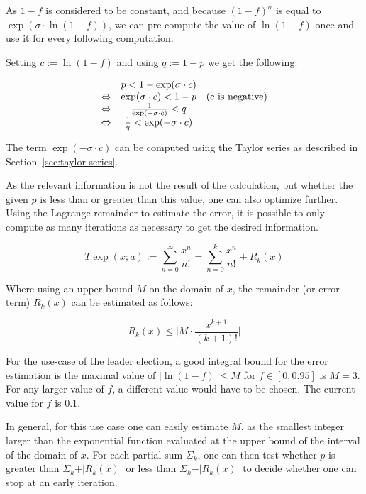 \documentclass[11pt,a4paper,dvipsnames]{article}
\theoremstyle{definition}
\theoremstyle{definition}
\begin{document}
As $1-f$ is considered to be constant, and because ${(1-f)}^{\sigma}$ is equal
to $\exp(\sigma\cdot\ln(1-f))$, we can pre-compute the value of $\ln(1-f)$ once
and use it for every following computation.

Setting $c:= \ln(1 - f)$ and using $q := 1 - p$ we get the following:

\begin{equation*}
  \begin{array}[h]{ccc}
    & p < 1 - \exp(\sigma \cdot c) & \\
    \Leftrightarrow & \exp(\sigma \cdot c) < 1 - p & (\textrm{c is negative})\\
    \Leftrightarrow & \frac{1}{\exp(-\sigma \cdot c)} < q & \\
    \Leftrightarrow & \frac{1}{q} < \exp(-\sigma \cdot c) &
  \end{array}
\end{equation*}

The term $\exp(-\sigma \cdot c)$ can be computed using the Taylor series as
described in Section~\ref{sec:taylor-series}.

As the relevant information is not the result of the calculation, but whether
the given $p$ is less than or greater than this value, one can also optimize
further. Using the Lagrange remainder to estimate the error, it is possible to
only compute as many iterations as necessary to get the desired information.

\begin{equation*}
    T \exp(x; a) := \sum_{n=0}^{\infty}\frac{x^{n}}{n!} =
    \sum_{n=0}^k\frac{x^{n}}{n!} + R_{k}(x)
\end{equation*}

Where using an upper bound $M$ on the domain of $x$, the remainder (or error
term) $R_{k}(x)$ can be estimated as follows:

\begin{equation*}
  R_{k}(x) \leq \vert M \cdot \frac{x^{k+1}}{(k+1)!}\vert
\end{equation*}

For the use-case of the leader election, a good integral bound for the error
estimation is the maximal value of $\vert\ln(1 - f)\vert\leq M$ for
$f \in [0, 0.95]$ is $M = 3$. For any larger value of $f$, a different value
would have to be chosen. The current value for $f$ is $0.1$.

In general, for this use case one can easily estimate $M$, as the smallest
integer larger than the exponential function evaluated at the upper bound of the
interval of the domain of $x$. For each partial sum $\Sigma_{k}$, one can then
test whether $p$ is greater than $\Sigma_k + \vert R_{k}(x) \vert$ or less than
$\Sigma_k - \vert R_{k}(x)\vert$ to decide whether one can stop at an early
iteration.
\end{document}
